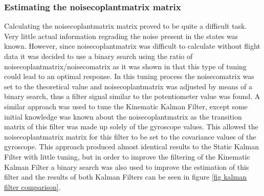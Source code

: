 \subsubsection{Estimating the \gls{noisecoplantmatrix} matrix}

 Calculating the \gls{noisecoplantmatrix} matrix proved to be quite a difficult task. Very little actual information regrading the noise present in the states was known. However, since \gls{noisecoplantmatrix} was difficult to calculate without flight data it was decided to use a binary search using the ratio of \gls{noisecoplantmatrix}/\gls{noisecomatrix} as it was shown in \cite{gordon_paper} that this type of tuning could lead to an optimal response. In this tuning process the \gls{noisecomatrix} was set to the theoretical value and \gls{noisecoplantmatrix} was adjusted by means of a binary search, thus a filter signal similar to the potentiometer value was found. A similar approach was used to tune the Kinematic Kalman Filter, except some initial knowledge was known about the \gls{noisecoplantmatrix} as the transition matrix of this filter was made up solely of the gyroscope values. This allowed the \gls{noisecoplantmatrix} matrix for this filter to be set to the covariance values of the gyroscope. This approach produced almost identical results to the Static Kalman Filter with little tuning, but in order to improve the filtering of the Kinematic Kalman Filter a binary search was also used to improve the estimation of this filter and the results of both Kalman Filters can be seen in figure \ref{fig kalman filter comparison}.                                                                                                                                                                                                                                                                                                                                                                                                                                                                                                                                                                                                                                                                                                                                                                                                                                                                                                                                                                                                                                                                                                                                                                                                          
